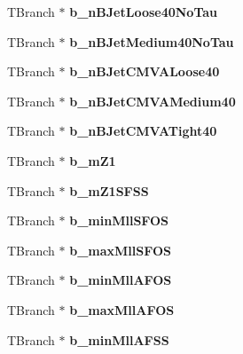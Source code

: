 \begin{DoxyCompactItemize}
T\+Branch $\ast$ {\bfseries b\+\_\+n\+B\+Jet\+Loose40\+No\+Tau}
\item 
\hypertarget{classMiniTree_a9c23bc479f9f63731c7c96d66f5247f5}{}\label{classMiniTree_a9c23bc479f9f63731c7c96d66f5247f5} 
T\+Branch $\ast$ {\bfseries b\+\_\+n\+B\+Jet\+Medium40\+No\+Tau}
\item 
\hypertarget{classMiniTree_a2b1e194e7ef9259fef3be72c2f11ab14}{}\label{classMiniTree_a2b1e194e7ef9259fef3be72c2f11ab14} 
T\+Branch $\ast$ {\bfseries b\+\_\+n\+B\+Jet\+C\+M\+V\+A\+Loose40}
\item 
\hypertarget{classMiniTree_a6554123a9310198e9a53c37a73b92030}{}\label{classMiniTree_a6554123a9310198e9a53c37a73b92030} 
T\+Branch $\ast$ {\bfseries b\+\_\+n\+B\+Jet\+C\+M\+V\+A\+Medium40}
\item 
\hypertarget{classMiniTree_a5aad0ec3319e8c496a30cec2d4a094b0}{}\label{classMiniTree_a5aad0ec3319e8c496a30cec2d4a094b0} 
T\+Branch $\ast$ {\bfseries b\+\_\+n\+B\+Jet\+C\+M\+V\+A\+Tight40}
\item 
\hypertarget{classMiniTree_a6bbd50053a189e914df25c01f5ff175c}{}\label{classMiniTree_a6bbd50053a189e914df25c01f5ff175c} 
T\+Branch $\ast$ {\bfseries b\+\_\+m\+Z1}
\item 
\hypertarget{classMiniTree_a103dd7f519f9418f0e3cea43f44991c9}{}\label{classMiniTree_a103dd7f519f9418f0e3cea43f44991c9} 
T\+Branch $\ast$ {\bfseries b\+\_\+m\+Z1\+S\+F\+SS}
\item 
\hypertarget{classMiniTree_af513ebb549bc6c1ba0e20b1ba6ae0ab3}{}\label{classMiniTree_af513ebb549bc6c1ba0e20b1ba6ae0ab3} 
T\+Branch $\ast$ {\bfseries b\+\_\+min\+Mll\+S\+F\+OS}
\item 
\hypertarget{classMiniTree_aeb55f15959228c91500792c8ad78423a}{}\label{classMiniTree_aeb55f15959228c91500792c8ad78423a} 
T\+Branch $\ast$ {\bfseries b\+\_\+max\+Mll\+S\+F\+OS}
\item 
\hypertarget{classMiniTree_a43789be17bc34d8c17f2a932a35ad6af}{}\label{classMiniTree_a43789be17bc34d8c17f2a932a35ad6af} 
T\+Branch $\ast$ {\bfseries b\+\_\+min\+Mll\+A\+F\+OS}
\item 
\hypertarget{classMiniTree_a7b9bf7690c013cc31cc3f5963bc999e8}{}\label{classMiniTree_a7b9bf7690c013cc31cc3f5963bc999e8} 
T\+Branch $\ast$ {\bfseries b\+\_\+max\+Mll\+A\+F\+OS}
\item 
\hypertarget{classMiniTree_ab86d77ec0767ee6914047db5d5e710f1}{}\label{classMiniTree_ab86d77ec0767ee6914047db5d5e710f1} 
T\+Branch $\ast$ {\bfseries b\+\_\+min\+Mll\+A\+F\+SS}
\item 
\hypertarget{classMiniTree_a8cdcd9c34358f3f1d5b98902e8550b3c}{}\label{classMiniTree_a8cdcd9c34358f3f1d5b98902e8550b3c} 

\end{DoxyCompactItemize}
